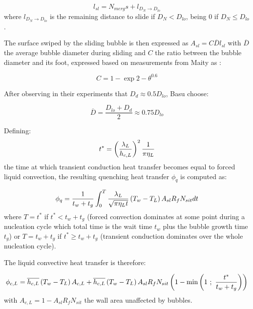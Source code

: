 \begin{equation}
l_{sl}=N_{merg}s + l_{D_{N}\rightarrow D_{lo}}
\end{equation}
where $l_{D_{N}\rightarrow D_{lo}}$ is the remaining distance to slide if $D_{N}<D_{lo}$, being $0$ if $D_{N} \leq D_{lo}$.

\npar

The surface swiped by the sliding bubble is then expressed as $A_{sl} = C\overline{D}l_{sl}$ with $\overline{D}$ the average bubble diameter during sliding and $C$ the ratio between the bubble diameter and its foot, expressed  based on measurements from Maity \cite{maity_effect_2000} as :

\begin{equation}
C=1-\exp{2-\theta ^{0.6}}
\end{equation}

After observing in their experiments that $D_{d}\approx 0.5D_{lo}$, Basu \etal choose:

\begin{equation}
\overline{D}=\frac{D_{lo}+D_{d}}{2}\approx 0.75D_{lo}
\end{equation}


Defining:
\begin{equation}
t^{*}=\left( \dfrac{\lambda_{L}}{h_{c,L}} \right)^{2} \dfrac{1}{\pi \eta_{L}}
\label{eq:basu_hfp_tstar}
\end{equation} the time at which transient conduction heat transfer becomes equal to forced liquid convection, the resulting quenching heat transfer $\phi_{q}$ is computed as:

\begin{equation}
\phi_{q} = \frac{1}{t_{w}+t_{g}} \int_{0}^{T}\frac{\lambda_{L}}{\sqrt{\pi \eta_{L}t}}\left( T_{w}-T_{L} \right)A_{sl}R_{f}N_{sit}dt
\end{equation}
where $T=t^{*}$ if $t^{*}<t_{w}+t_{g}$ (forced convection dominates at some point during a nucleation cycle which total time is the wait time $t_{w}$ plus the bubble growth time $t_{g}$) or $T=t_{w}+t_{g}$ if $t^{*}\geq t_{w}+t_{g}$ (transient conduction dominates over the whole nucleation cycle).

\npar
The liquid convective heat transfer is therefore:

\begin{equation}
\phi_{c,L} = \overline{h_{c,L}}\parth{T_{w}-T_{L}}A_{c,L} + \overline{h_{c,L}}\parth{T_{w}-T_{L}}A_{sl}R_{f}N_{sit}\parth{1-\mathrm{min}\parth{1\ ;\ \frac{t^{*}}{t_{w}+t_{g}}}}
\label{eq:basu_hfp_phicL}
\end{equation}
with $A_{c,L} = 1 - A_{sl}R_{f}N_{sit}$ the wall area unaffected by bubbles.

